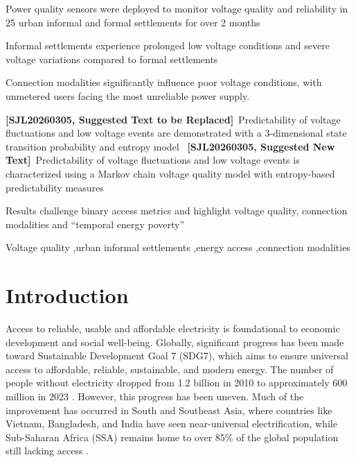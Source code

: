 \documentclass[review]{elsarticle}
\DeclareRobustCommand{\suggestreplacesjl}[2]{%
  {\color{sjlmutedred}\textbf{[SJL20260305, Suggested Text to be Replaced]}\ #1}%
  \ {\color{sjlmutedblue}\textbf{[SJL20260305, Suggested New Text]}\ #2}%
}
\begin{document}
\begin{frontmatter}
\begin{highlights}
\item Power quality sensors were deployed to monitor voltage quality and reliability in 25 urban informal and formal settlements for over 2 months
\item Informal settlements experience prolonged low voltage conditions and severe voltage variations compared to formal settlements
\item Connection modalities significantly influence poor voltage conditions,  with unmetered users facing the most unreliable power supply.
\item \suggestreplacesjl{Predictability of voltage fluctuations and low voltage events are demonstrated with a 3-dimensional state transition probability and entropy model}{Predictability of voltage fluctuations and low voltage events is characterized using a Markov chain voltage quality model with entropy-based predictability measures}
\item Results challenge binary access metrics and highlight voltage quality, connection modalities and  “temporal energy poverty”
\end{highlights}



\begin{keyword}
Voltage quality \sep urban informal settlements \sep energy access \sep connection modalities 
\end{keyword}

\end{frontmatter}

\section{Introduction}
\label{sec:intro}
Access to reliable, usable and affordable electricity is foundational to economic development and social well-being. Globally, significant progress has been made toward Sustainable Development Goal 7 (SDG7), which aims to ensure universal access to affordable, reliable, sustainable, and modern energy. The number of people without electricity dropped from 1.2 billion in 2010 to approximately 600 million in 2023 \cite{SDG7Report2020, IEA2023Electricity, ayaburi2020measuring}. However, this progress has been uneven. Much of the improvement has occurred in South and Southeast Asia, where countries like Vietnam, Bangladesh, and India have seen near-universal electrification, while Sub-Saharan Africa (SSA) remains home to over 85\% of the global population still lacking access \cite{sdg72025, IEA2024SDG7}.
\end{document}
